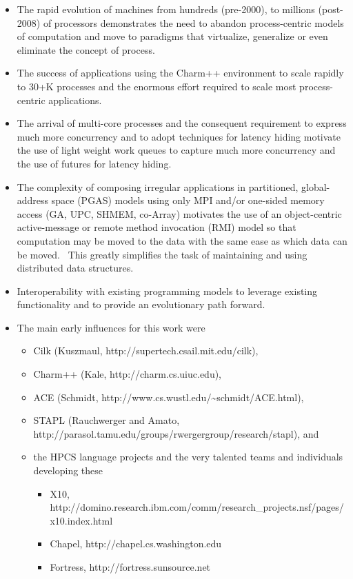 \documentclass[letterpaper]{article}
\newcommand\liststyleLiv{%
\renewcommand\labelitemi{${\bullet}$}
\renewcommand\labelitemii{${\circ}$}
\renewcommand\labelitemiii{${\blacksquare}$}
\renewcommand\labelitemiv{${\bullet}$}
}
\begin{document}
\liststyleLiv
\begin{itemize}
\item The rapid evolution of machines from hundreds (pre-2000), to millions (post-2008) of processors demonstrates the
need to abandon process-centric models of computation and move to paradigms that virtualize, generalize or even
eliminate the concept of process. \ 
\item The success of applications using the Charm++ environment to scale rapidly to 30+K processes and the enormous
effort required to scale most process-centric applications.
\item The arrival of multi-core processes and the consequent requirement to express much more concurrency and to adopt
techniques for latency hiding motivate the use of light weight work queues to capture much more concurrency and the use
of futures for latency hiding.
\item The complexity of composing irregular applications in partitioned, global-address space (PGAS) models using only
MPI and/or one-sided memory access (GA, UPC, SHMEM, co-Array) motivates the use of an object-centric active-message or
remote method invocation (RMI) model so that computation may be moved to the data with the same ease as which data can
be moved. \ This greatly simplifies the task of maintaining and using distributed data structures.
\item Interoperability with existing programming models to leverage existing functionality and to provide an
evolutionary path forward.
\item The main early influences for this work were

\begin{itemize}
\item Cilk (Kuszmaul, http://supertech.csail.mit.edu/cilk), 
\item Charm++ (Kale, http://charm.cs.uiuc.edu),
\item ACE (Schmidt, http://www.cs.wustl.edu/\~{}schmidt/ACE.html),
\item STAPL (Rauchwerger and Amato, http://parasol.tamu.edu/groups/rwergergroup/research/stapl), and
\item the HPCS language projects and the very talented teams and individuals developing these

\begin{itemize}
\item X10, http://domino.research.ibm.com/comm/research\_projects.nsf/pages/x10.index.html
\item Chapel, http://chapel.cs.washington.edu
\item Fortress, http://fortress.sunsource.net
\end{itemize}
\end{itemize}
\end{itemize}
\end{document}
